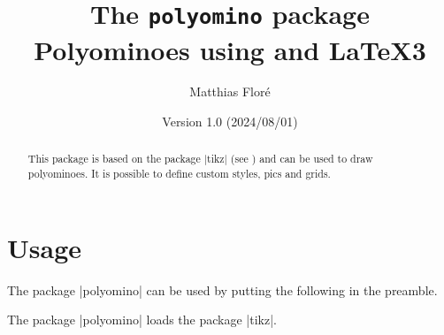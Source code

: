 \documentclass[a4paper,english,dvipsnames]{ltxdoc}
\title{The \texttt{polyomino} package\\[12pt]\large Polyominoes using \tikzname{} and \LaTeX3}
\author{Matthias Floré}
\date{Version 1.0 (2024/08/01)}%
\begin{document}
\maketitle
\thispagestyle{fancy}
\begin{abstract}
\noindent This package is based on the package |tikz| (see \cite{TtTaPGFp}) and can be used to draw polyominoes. It is possible to define custom styles, pics and grids.%
\end{abstract}
\tableofcontents
\section{Usage}
The package |polyomino| can be used by putting the following in the preamble.
\begin{codeexample}
\usepackage{polyomino}
\end{codeexample}
The package |polyomino| loads the package |tikz|.
\end{document}
